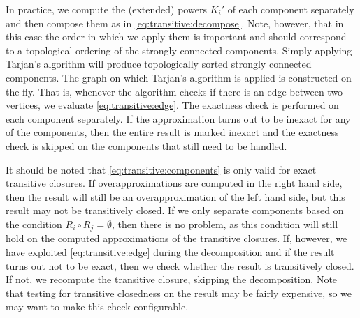 In practice, we compute the (extended) powers $K_i'$ of each component
separately and then compose them as in \eqref{eq:transitive:decompose}.
Note, however, that in this case the order in which we apply them is
important and should correspond to a topological ordering of the
strongly connected components.  Simply applying Tarjan's
algorithm will produce topologically sorted strongly connected components.
The graph on which Tarjan's algorithm is applied is constructed on-the-fly.
That is, whenever the algorithm checks if there is an edge between
two vertices, we evaluate \eqref{eq:transitive:edge}.
The exactness check is performed on each component separately.
If the approximation turns out to be inexact for any of the components,
then the entire result is marked inexact and the exactness check
is skipped on the components that still need to be handled.

It should be noted that \eqref{eq:transitive:components}
is only valid for exact transitive closures.
If overapproximations are computed in the right hand side, then the result will
still be an overapproximation of the left hand side, but this result
may not be transitively closed.  If we only separate components based
on the condition $R_i \circ R_j = \emptyset$, then there is no problem,
as this condition will still hold on the computed approximations
of the transitive closures.  If, however, we have exploited
\eqref{eq:transitive:edge} during the decomposition and if the
result turns out not to be exact, then we check whether
the result is transitively closed.  If not, we recompute
the transitive closure, skipping the decomposition.
Note that testing for transitive closedness on the result may
be fairly expensive, so we may want to make this check
configurable.

